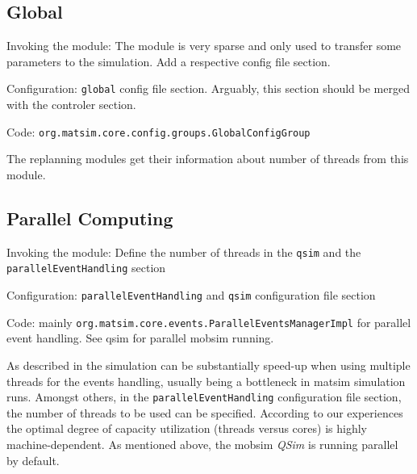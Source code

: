 
\subsection{Global}
\label{sec:global}
\begin{compactitem}
\item Invoking the module: The module is very sparse and only used to transfer some parameters to the simulation. Add a respective config file section.
\item Configuration: \lstinline|global| config file section. Arguably, this section should be merged with the controler section.
\item Code: \lstinline|org.matsim.core.config.groups.GlobalConfigGroup|
\end{compactitem}

The replanning modules get their information about number of threads from this module. 



\subsection{Parallel Computing}
\label{sec:parallelcomputing}
\begin{compactitem}
\item Invoking the module: Define the number of threads in the \lstinline|qsim| and the \lstinline|parallelEventHandling| section
\item Configuration: \lstinline|parallelEventHandling| and \lstinline|qsim| configuration file section
\item Code: mainly \lstinline|org.matsim.core.events.ParallelEventsManagerImpl| for parallel event handling. See qsim for parallel mobsim running.
\end{compactitem}

As described in \citet[][]{WaraichEtAl_TechRep_IVT_2009, WaraichEtAl_STRC_2009} the simulation can be substantially speed-up when using multiple threads for the events handling, usually being a bottleneck in \gls{matsim} simulation runs. Amongst others, in the \lstinline|parallelEventHandling| configuration file section, the number of threads to be used can be specified. 
According to our experiences the optimal degree of capacity utilization (threads versus cores) is highly machine-dependent.
As mentioned above, the mobsim \emph{QSim} is running parallel by default.

